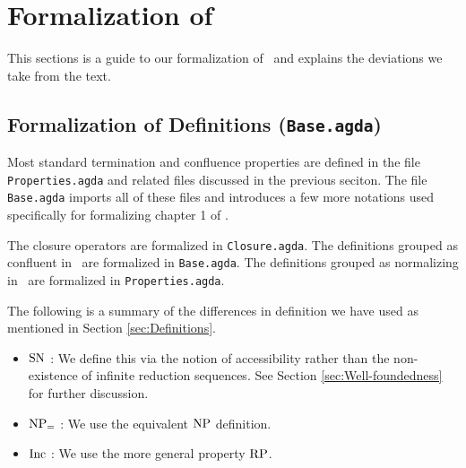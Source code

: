 \section{Formalization of \terese}
\label{sec:Formalization}
This sections is a guide to our formalization of \terese $\,$ and explains the deviations we take from the text.

\subsection{Formalization of Definitions (\texttt{Base.agda})}\label{subsec:def}


Most standard termination and confluence properties are defined in the file \texttt{Properties.agda}
and related files discussed in the previous seciton.  The file \texttt{Base.agda} imports all of these files
and introduces a few more notations used specifically for formalizing chapter 1 of \cite{Terese}.

The closure operators are formalized in \texttt{Closure.agda}.
The definitions grouped as confluent in \terese $\,$ are formalized in \texttt{Base.agda}.
The definitions grouped as normalizing in \terese $\,$ are formalized in \texttt{Properties.agda}.



The following is a summary of the differences in definition we have used as mentioned in Section \ref{sec:Definitions}.
\begin{itemize}
    \item $\mathrm{SN}$ : We define this via the notion of accessibility rather than the non-existence of infinite reduction sequences.
     See Section \ref{sec:Well-foundedness} for further discussion.
    \item $\mathrm{NP_=}$ : We use the equivalent $\mathrm{NP}$ definition.
    \item $\mathrm{Inc}$ : We use the more general property $\mathrm{RP}$.
\end{itemize}

